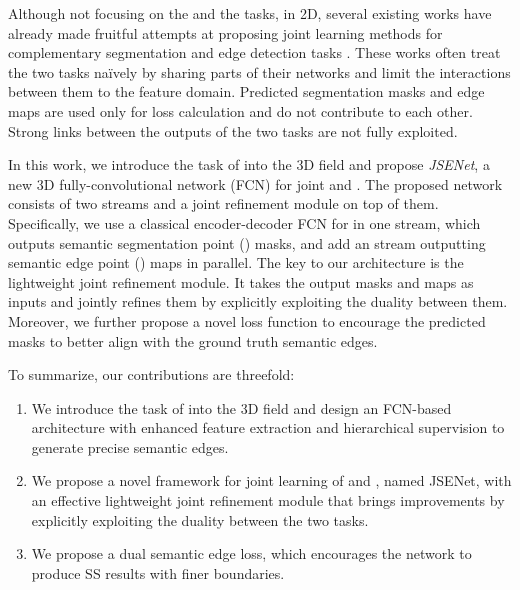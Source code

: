 \documentclass[runningheads]{llncs}
\begin{document}
{Although not focusing on the {\SemSeg} and the {\SemEdgeD} tasks, in 2D, several existing works have already made fruitful attempts at proposing joint learning methods for complementary segmentation and edge detection tasks 
\cite{takikawa2019gated,cheng2017fusionnet,bertasius2016semantic,peng2017large,su2019selectivity,lin2017refinenet,wu2019stacked}. These works often treat the two tasks na\"{i}vely by sharing parts of their networks and limit the interactions between them to the feature domain. Predicted segmentation masks and edge maps are used only for loss calculation and do not contribute to each other.
Strong links between the outputs of the two tasks are not fully exploited.}



In this work, we introduce the task of {\SemEdgeD} into the 3D field 
and propose \emph{JSENet}, a new 3D fully-convolutional network (FCN) for joint {\SemSeg} and {\SemEdgeD}. The proposed network consists of two streams and a joint refinement module on top of them. Specifically, we use a classical encoder-decoder FCN for {\SemSeg} in one stream, which outputs semantic segmentation point (\SemSegPoint) masks, and add an {\SemEdgeD} stream outputting semantic edge point (\SemEdgePoint) maps in parallel. The key to our architecture is the lightweight joint refinement module. It takes the output {\SemSegPoint} masks and {\SemEdgePoint} maps as inputs and jointly refine{s} them by explicitly exploiting the duality between them. Moreover, we further propose a novel loss function to encourage the predicted {\SemSegPoint} masks to {better} align with the ground truth semantic edges. 


To summarize, our contributions are threefold: 
    \begin{enumerate}
    \item We introduce the task of {\SemEdgeD} into the 3D {field}  and design an FCN-based architecture with enhanced feature extraction and hierarchical supervision to generate precise semantic edges.

    \item We propose a novel framework for joint learning of {\SemSeg} and {\SemEdgeD}, named JSENet, with an effective lightweight joint refinement module {that}
brings improvements by explicitly exploiting the duality between the two tasks. 
    
    \item We propose a dual semantic edge loss{, which} 
{encourages the network to produce SS results with finer boundaries.} 
\end{enumerate}
\end{document}
